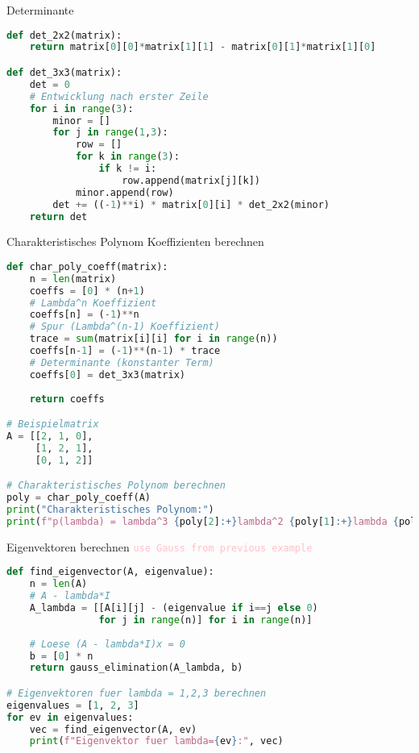 \begin{examplecode}{Determinante}
\begin{lstlisting}[language=Python, style=basesmol]
def det_2x2(matrix):
    return matrix[0][0]*matrix[1][1] - matrix[0][1]*matrix[1][0]

def det_3x3(matrix):
    det = 0
    # Entwicklung nach erster Zeile
    for i in range(3):
        minor = []
        for j in range(1,3):
            row = []
            for k in range(3):
                if k != i:
                    row.append(matrix[j][k])
            minor.append(row)
        det += ((-1)**i) * matrix[0][i] * det_2x2(minor)
    return det
\end{lstlisting}
\end{examplecode}

\begin{examplecode}{Charakteristisches Polynom Koeffizienten berechnen}
\begin{lstlisting}[language=Python, style=basesmol]
def char_poly_coeff(matrix):
    n = len(matrix)
    coeffs = [0] * (n+1)
    # Lambda^n Koeffizient
    coeffs[n] = (-1)**n
    # Spur (Lambda^(n-1) Koeffizient)
    trace = sum(matrix[i][i] for i in range(n))
    coeffs[n-1] = (-1)**(n-1) * trace
    # Determinante (konstanter Term)
    coeffs[0] = det_3x3(matrix)
    
    return coeffs

# Beispielmatrix
A = [[2, 1, 0],
     [1, 2, 1],
     [0, 1, 2]]

# Charakteristisches Polynom berechnen
poly = char_poly_coeff(A)
print("Charakteristisches Polynom:")
print(f"p(lambda) = lambda^3 {poly[2]:+}lambda^2 {poly[1]:+}lambda {poly[0]:+}")
\end{lstlisting}
\end{examplecode}

\begin{examplecode}{Eigenvektoren berechnen} \textcolor{pink}{\texttt{use Gauss from previous example}} 
\begin{lstlisting}[language=Python, style=basesmol]
def find_eigenvector(A, eigenvalue):
    n = len(A)
    # A - lambda*I
    A_lambda = [[A[i][j] - (eigenvalue if i==j else 0) 
                for j in range(n)] for i in range(n)]
    
    # Loese (A - lambda*I)x = 0
    b = [0] * n
    return gauss_elimination(A_lambda, b)

# Eigenvektoren fuer lambda = 1,2,3 berechnen
eigenvalues = [1, 2, 3]
for ev in eigenvalues:
    vec = find_eigenvector(A, ev)
    print(f"Eigenvektor fuer lambda={ev}:", vec)
\end{lstlisting}
\end{examplecode}

